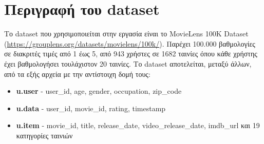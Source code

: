 \section{Περιγραφή του dataset}

Το dataset που χρησιμοποιείται στην εργασία είναι το MovieLens 100K Dataset (\href{https://grouplens.org/datasets/movielens/100k/}{https://grouplens.org/datasets/movielens/100k/}).
Παρέχει 100.000 βαθμολογίες σε διακριτές τιμές από 1 έως 5, από 943 χρήστες σε 1682 ταινίες όπου κάθε χρήστης έχει βαθμολογήσει τουλάχιστον 20 ταινίες.
Το dataset αποτελείται, μεταξύ άλλων, από τα εξής αρχεία με την αντίστοιχη δομή τους:
\begin{itemize}
	\item \textbf{u.user} - user\_id, age, gender, occupation, zip\_code
	\item \textbf{u.data} - user\_id, movie\_id, rating, timestamp
	\item \textbf{u.item} - movie\_id, title, release\_date, video\_release\_date, imdb\_url και 19 κατηγορίες ταινιών
\end{itemize}
